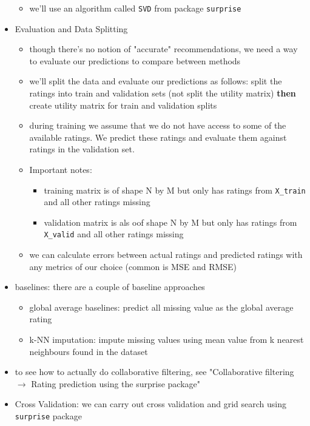 \documentclass[10.5pt,a4paper, fleqn, dvipsnames]{article}
\begin{document}
\begin{itemize}
\begin{itemize}
        \item we'll use an algorithm called \lstinline{SVD} from package \lstinline{surprise}
    \end{itemize}
    \item Evaluation and Data Splitting 
    \begin{itemize}
        \item though there's no notion of "accurate" recommendations, we need a way to evaluate our predictions to compare between methods
        \item we'll split the data and evaluate our predictions as follows: split the ratings into train and validation sets (not split the utility matrix) \textbf{then} create utility matrix for train and validation splits
        \item during training we assume that we do not have access to some of the available ratings. We predict these ratings and evaluate them against ratings in the validation set.
        \item Important notes:
        \begin{itemize}[leftmargin = 2em]
            \item training matrix is of shape N by M but only has ratings from \lstinline{X_train} and all other ratings missing
            \item validation matrix is als oof shape N by M but only has ratings from \lstinline{X_valid} and all other ratings missing
        \end{itemize}
        \item we can calculate errors between actual ratings and predicted ratings with any metrics of our choice (common is MSE and RMSE)
    \end{itemize}
    \item baselines: there are a couple of baseline approaches
    \begin{itemize}
        \item global average baselines: predict all missing value as the global average rating
        \item k-NN imputation: impute missing values using mean value from k nearest neighbours found in the dataset
    \end{itemize}
    \item to see how to actually do collaborative filtering, see "Collaborative filtering $\rightarrow$ Rating prediction using the surprise package"
    \item Cross Validation: we can carry out cross validation and grid search using \lstinline{surprise} package

\end{itemize}
\end{document}
